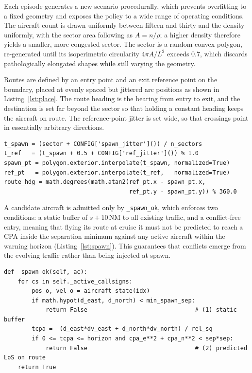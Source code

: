 Each episode generates a new scenario procedurally, which prevents overfitting to a fixed geometry and exposes the policy to a wide range of operating conditions. The aircraft count is drawn uniformly between fifteen and thirty and the density uniformly, with the sector area following as $A = n/\rho$; a higher density therefore yields a smaller, more congested sector. The sector is a random convex polygon, re-generated until its isoperimetric circularity $4\pi A / L^2$ exceeds $0.7$, which discards pathologically elongated shapes while still varying the geometry.

Routes are defined by an entry point and an exit reference point on the boundary, placed at evenly spaced but jittered arc positions as shown in Listing~\ref{lst:place}. The route heading is the bearing from entry to exit, and the destination is set far beyond the sector so that holding a constant heading keeps the aircraft on route. The reference-point jitter is set wide, so that crossings point in essentially arbitrary directions.

\begin{lstlisting}[caption={Entry, exit and route heading for one aircraft (\texttt{sector.py}, abridged).}, label={lst:place}]
t_spawn = (sector + CONFIG['spawn_jitter']()) / n_sectors
t_ref   = (t_spawn + 0.5 + CONFIG['ref_jitter']()) % 1.0
spawn_pt = polygon.exterior.interpolate(t_spawn, normalized=True)
ref_pt   = polygon.exterior.interpolate(t_ref,   normalized=True)
route_hdg = math.degrees(math.atan2(ref_pt.x - spawn_pt.x,
                                    ref_pt.y - spawn_pt.y)) % 360.0
\end{lstlisting}

A candidate aircraft is admitted only by \texttt{\_spawn\_ok}, which enforces two conditions: a static buffer of $s + 10$\,NM to all existing traffic, and a conflict-free entry, meaning that flying its route at cruise it must not be predicted to reach a CPA inside the separation minimum against any active aircraft within the warning horizon (Listing~\ref{lst:spawn}). This guarantees that conflicts emerge from the evolving traffic rather than being injected at spawn.

\begin{lstlisting}[caption={Conflict-free spawn admission (\texttt{env.py}, abridged).}, label={lst:spawn}]
def _spawn_ok(self, ac):
    for cs in self._active_callsigns:
        pos_o, vel_o = aircraft_state(idx)
        if math.hypot(d_east, d_north) < min_spawn_sep:
            return False                               # (1) static buffer
        tcpa = -(d_east*dv_east + d_north*dv_north) / rel_sq
        if 0 <= tcpa <= horizon and cpa_e**2 + cpa_n**2 < sep*sep:
            return False                               # (2) predicted LoS on route
    return True
\end{lstlisting}


